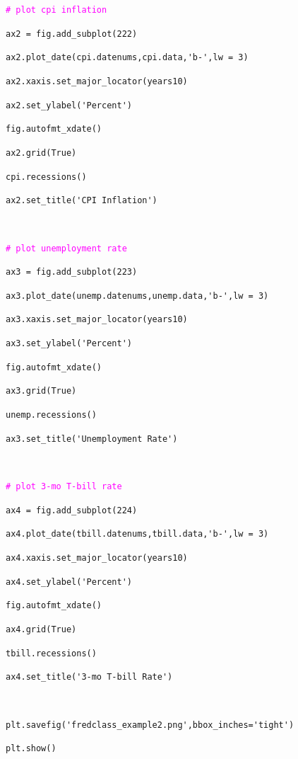 \documentclass[11pt,fleqn]{article}
\newcommand{\ttt}{\texttt}
\newcommand{\tc}{\textcolor}
\begin{document}
\begin{minipage}{6.5in}
\ttt{\tc{Magenta}{\# plot cpi inflation}}

\ttt{ax2 = fig.add\_subplot(222)}

\verb!ax2.plot_date(cpi.datenums,cpi.data,'b-',lw = 3)!

\ttt{ax2.xaxis.set\_major\_locator(years10)}

\verb!ax2.set_ylabel('Percent')!

\ttt{fig.autofmt\_xdate()}

\ttt{ax2.grid(True)}

\ttt{cpi.recessions()}

\verb!ax2.set_title('CPI Inflation')!

\

\end{minipage}

\begin{minipage}{6.5in}
\ttt{\tc{Magenta}{\# plot unemployment rate}}

\ttt{ax3 = fig.add\_subplot(223)}

\verb!ax3.plot_date(unemp.datenums,unemp.data,'b-',lw = 3)!

\ttt{ax3.xaxis.set\_major\_locator(years10)}

\verb!ax3.set_ylabel('Percent')!

\ttt{fig.autofmt\_xdate()}

\ttt{ax3.grid(True)}

\ttt{unemp.recessions()}

\verb!ax3.set_title('Unemployment Rate')!

\

\end{minipage}

\begin{minipage}{6.5in}
\ttt{\tc{Magenta}{\# plot 3-mo T-bill rate}}

\ttt{ax4 = fig.add\_subplot(224)}

\verb!ax4.plot_date(tbill.datenums,tbill.data,'b-',lw = 3)!

\ttt{ax4.xaxis.set\_major\_locator(years10)}

\verb!ax4.set_ylabel('Percent')!

\ttt{fig.autofmt\_xdate()}

\ttt{ax4.grid(True)}

\ttt{tbill.recessions()}

\verb!ax4.set_title('3-mo T-bill Rate')!

\

\verb!plt.savefig('fredclass_example2.png',bbox_inches='tight')!

\ttt{plt.show()}

\

\end{minipage}
\end{document}
